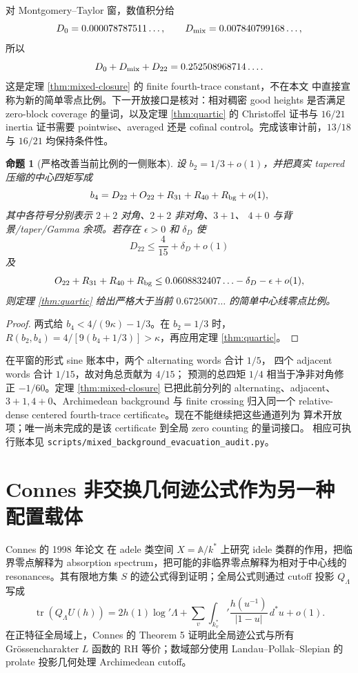 \documentclass[UTF8,11pt,a4paper]{ctexart}
\newtheorem{proposition}[theorem]{命题}
\theoremstyle{definition}
\theoremstyle{remark}
\newcommand{\tr}{\operatorname{tr}}
\begin{document}
对 Montgomery--Taylor 窗，数值积分给
\[
 D_0=0.000078787511\ldots,\qquad
 D_{\rm mix}=0.007840799168\ldots,
\]
所以
\[
 D_0+D_{\rm mix}+D_{22}
 =0.252508968714\ldots.
 \label{eq:mt-centered-fourth}
\]
这是定理 \ref{thm:mixed-closure} 的 finite fourth-trace constant，不在本文
中直接宣称为新的简单零点比例。下一开放接口是核对：相对稠密 good heights
是否满足 zero-block coverage 的量词，以及定理 \ref{thm:quartic} 的
Christoffel 证书与 $16/21$ inertia 证书需要 pointwise、averaged 还是
cofinal control。完成该审计前，$13/18$ 与 $16/21$ 均保持条件性。
\begin{proposition}[严格改善当前比例的一侧账本]\label{prop:fourth-ledger}
设 $b_2=1/3+o(1)$，并把真实 tapered 压缩的中心四矩写成
\[
 b_4=D_{22}+O_{22}+R_{31}+R_{40}+R_{\rm bg}+o(1),
\]
其中各符号分别表示 $2+2$ 对角、$2+2$ 非对角、$3+1$、
$4+0$ 与背景/taper/Gamma 余项。若存在 $\epsilon>0$ 和 $\delta_D$ 使
\[
 D_{22}\le\frac4{15}+\delta_D+o(1)
\]
及
\[
 O_{22}+R_{31}+R_{40}+R_{\rm bg}
 \le0.0608832407\ldots-\delta_D-\epsilon+o(1),
\]
则定理 \ref{thm:quartic} 给出严格大于当前
$0.6725007\ldots$ 的简单中心线零点比例。
\end{proposition}

\begin{proof}
两式给
$b_4<4/(9\kappa)-1/3$。在 $b_2=1/3$ 时，
$R(b_2,b_4)=4/[9(b_4+1/3)]>\kappa$，再应用定理
\ref{thm:quartic}。
\end{proof}

在平窗的形式 sine 账本中，两个 alternating words 合计 $1/5$，
四个 adjacent words 合计 $1/15$，故对角总贡献为 $4/15$；
预测的总四矩 $1/4$ 相当于净非对角修正 $-1/60$。定理
\ref{thm:mixed-closure} 已把此前分列的 alternating、adjacent、
$3+1,4+0$、Archimedean background 与 finite crossing 归入同一个
relative-dense centered fourth-trace certificate。现在不能继续把这些通道列为
算术开放项；唯一尚未完成的是该 certificate 到全局 zero counting 的量词接口。
相应可执行账本见
\texttt{scripts/mixed\_background\_evacuation\_audit.py}。

\section{Connes 非交换几何迹公式作为另一种配置载体}

Connes 的 1998 年论文 \cite{Connes98} 在 adele 类空间
$X=\mathbb A/k^*$ 上研究 idele 类群的作用，把临界零点解释为 absorption
spectrum，把可能的非临界零点解释为相对于中心线的 resonances。其有限地方集
$S$ 的迹公式得到证明；全局公式则通过 cutoff 投影 $Q_\Lambda$ 写成
\[
 \tr(Q_\Lambda U(h))
 =2h(1)\log'\Lambda+
 \sum_v\int_{k_v^*}'\frac{h(u^{-1})}{|1-u|}\,d^*u+o(1).
\]
在正特征全局域上，Connes 的 Theorem 5 证明此全局迹公式与所有
Grössencharakter $L$ 函数的 RH 等价；数域部分使用
Landau--Pollak--Slepian 的 prolate 投影几何处理 Archimedean cutoff。
\end{document}
